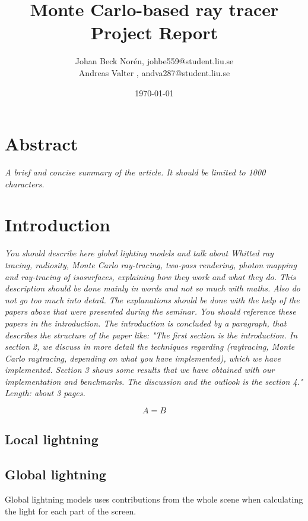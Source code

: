 \documentclass[]{report}   %
\begin{document}
\title{Monte Carlo-based ray tracer\\ Project Report}   %
\author{
	Johan Beck Norén, johbe559@student.liu.se
	\\Andreas Valter , andva287@student.liu.se
	}
\date{\today}    %
\maketitle

\setcounter{page}{2}
\chapter{Abstract}
\emph{ A brief and concise summary of the article. It should be limited to 1000 characters.}
\chapter{Introduction}
\emph{You should describe here global lighting models and talk about Whitted ray tracing, radiosity, Monte Carlo ray-tracing, two-pass rendering, photon mapping and ray-tracing of isosurfaces, explaining how they work and what they do. 
This description should be done mainly in words and not so much with maths. 
Also do not go too much into detail. 
The explanations should be done with the help of the papers above that were presented during the seminar. 
You should reference these papers in the introduction. 
The introduction is concluded by a paragraph, that describes the structure of the paper like: "The first section is the introduction. 
In section 2, we discuss in more detail the techniques regarding (raytracing, Monte Carlo raytracing, depending on what you have implemented), which we have implemented. 
Section 3 shows some results that we have obtained with our implementation and benchmarks. 
The discussion and the outlook is the section 4." 
Length: about 3 pages.}

\begin{equation} \label{eq:light}
A=B
\end{equation}
\section{Local lightning}

\section{Global lightning}
Global lightning models uses contributions from the whole scene when calculating the light for each part of the screen.
\end{document}
